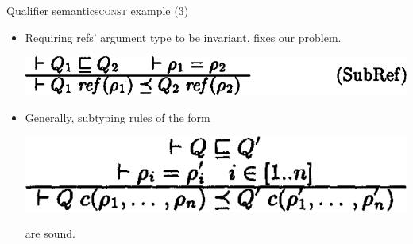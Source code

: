 \documentclass{beamer}
\begin{document}
\begin{frame}{Qualifier semantics}{\textsc{const} example (3)}
  \begin{itemize}
  \item Requiring refs' argument type to be invariant, fixes our problem.
    \begin{center}
    \includegraphics[scale=0.29]{paper_ref_sound.png}
    \end{center}
  \item<2-> Generally, subtyping rules of the form
    \begin{center}
    \includegraphics[scale=0.3]{paper_subtypingrule_general.png}
    \end{center}
    are sound.
  \end{itemize}
\end{frame}
\end{document}
